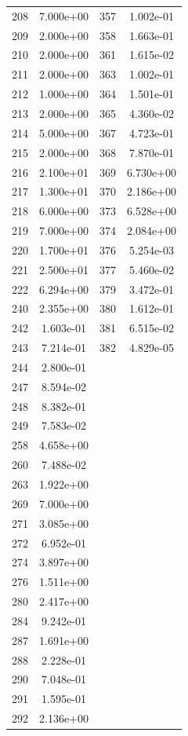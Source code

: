 \documentclass[12pt]{article}
\begin{document}
\begin{longtable}{@{}cccc@{}}
208 & 7.000e+00 & 357 & 1.002e-01 \\
209 & 2.000e+00 & 358 & 1.663e-01 \\
210 & 2.000e+00 & 361 & 1.615e-02 \\
211 & 2.000e+00 & 363 & 1.002e-01 \\
212 & 1.000e+00 & 364 & 1.501e-01 \\
213 & 2.000e+00 & 365 & 4.360e-02 \\
214 & 5.000e+00 & 367 & 4.723e-01 \\
215 & 2.000e+00 & 368 & 7.870e-01 \\
216 & 2.100e+01 & 369 & 6.730e+00 \\
217 & 1.300e+01 & 370 & 2.186e+00 \\
218 & 6.000e+00 & 373 & 6.528e+00 \\
219 & 7.000e+00 & 374 & 2.084e+00 \\
220 & 1.700e+01 & 376 & 5.254e-03 \\
221 & 2.500e+01 & 377 & 5.460e-02 \\
222 & 6.294e+00 & 379 & 3.472e-01 \\
240 & 2.355e+00 & 380 & 1.612e-01 \\
242 & 1.603e-01 & 381 & 6.515e-02 \\
243 & 7.214e-01 & 382 & 4.829e-05 \\
244 & 2.800e-01 &  &  \\
247 & 8.594e-02 &  &  \\
248 & 8.382e-01 &  &  \\
249 & 7.583e-02 &  &  \\
258 & 4.658e+00 &  &  \\
260 & 7.488e-02 &  &  \\
263 & 1.922e+00 &  &  \\
269 & 7.000e+00 &  &  \\
271 & 3.085e+00 &  &  \\
272 & 6.952e-01 &  &  \\
274 & 3.897e+00 &  &  \\
276 & 1.511e+00 &  &  \\
280 & 2.417e+00 &  &  \\
284 & 9.242e-01 &  &  \\
287 & 1.691e+00 &  &  \\
288 & 2.228e-01 &  &  \\
290 & 7.048e-01 &  &  \\
291 & 1.595e-01 &  &  \\
292 & 2.136e+00 &  &  \\

\end{longtable}
\end{document}
